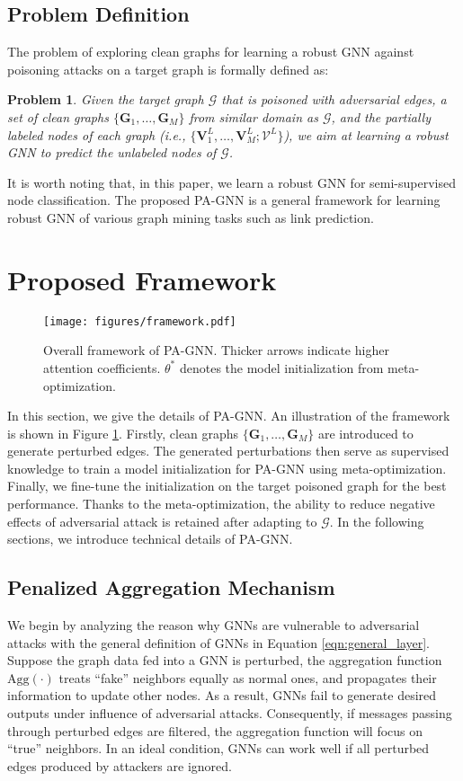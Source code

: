 \documentclass[sigconf]{acmart}
\newtheorem{mypro}{Problem}
\newcommand{\our}{{PA-GNN}\xspace}
\newcommand{\ours}{{PA-GNN}\xspace}
\def \G {\mathcal{G}}
\def \V {\mathcal{V}}
\def \bg {\mathbf{G}}
\begin{document}
\subsection{Problem Definition}
The problem of exploring clean graphs for learning a robust GNN against poisoning attacks on a target graph is formally defined as:
\begin{mypro}
\textit{Given the target graph $\G$ that is poisoned with adversarial edges, a set of clean graphs $\{\bg_1, \dots, \bg_M\}$ from similar domain as $\G$, and the partially labeled nodes of each graph (i.e., $\{\mathbf{V}_1^L, \dots, \mathbf{V}_M^L; \V^L\}$), we aim at learning a robust GNN to predict the unlabeled nodes of $\mathcal{G}$.}
\end{mypro}
It is worth noting that, in this paper, we learn a robust GNN for semi-supervised node classification. The proposed \our is a general framework for learning robust GNN of various graph mining tasks such as link prediction.
 \section{Proposed Framework}
\begin{figure}
    \centering
    \texttt{[image: figures/framework.pdf]}
\caption{Overall framework of \ours. Thicker arrows indicate higher attention coefficients. $\theta^*$ denotes the model initialization from meta-optimization.}
    \label{fig:overall}
    \vspace{-2em}
\end{figure}
In this section, we give the details of \ours. An illustration of the framework is shown in Figure \ref{fig:overall}. Firstly, clean graphs $\{\bg_1, \dots, \bg_M\}$ are introduced to generate perturbed edges. The generated perturbations then serve as supervised knowledge to train a model initialization for \ours using meta-optimization. Finally, we fine-tune the initialization on the target poisoned graph for the best performance. Thanks to the meta-optimization, the ability to reduce negative effects of adversarial attack is retained after adapting to $\G$. In the following sections, we introduce technical details of \ours.

\subsection{Penalized Aggregation Mechanism} \label{method:attn_penalty}
We begin by analyzing the reason why GNNs are vulnerable to adversarial attacks with the general definition of GNNs in Equation \ref{eqn:general_layer}.
Suppose the graph data fed into a GNN is perturbed, the aggregation function $\text{Agg}(\cdot)$ treats ``fake'' neighbors equally as normal ones, and propagates their information to update other nodes. 
As a result, GNNs fail to generate desired outputs under influence of adversarial attacks.
Consequently, if messages passing through perturbed edges are filtered, the aggregation function will focus on ``true'' neighbors. In an ideal condition, GNNs can work well if all perturbed edges produced by attackers are ignored.
\end{document}
